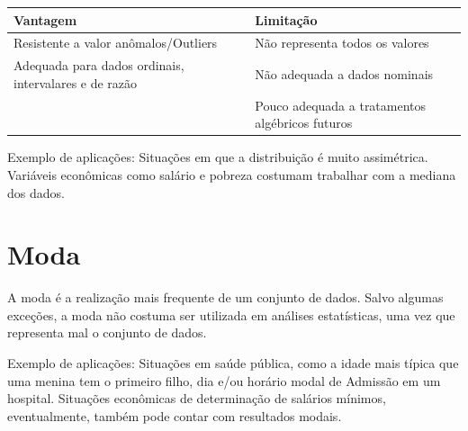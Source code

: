 \documentclass[
]{book}
\begin{document}
\begin{longtable}[]{@{}ll@{}}
\toprule
\begin{minipage}[b]{0.47\columnwidth}\raggedright
Vantagem\strut
\end{minipage} & \begin{minipage}[b]{0.47\columnwidth}\raggedright
Limitação\strut
\end{minipage}\tabularnewline
\midrule
\endhead
\begin{minipage}[t]{0.47\columnwidth}\raggedright
Resistente a valor anômalos/Outliers\strut
\end{minipage} & \begin{minipage}[t]{0.47\columnwidth}\raggedright
Não representa todos os valores\strut
\end{minipage}\tabularnewline
\begin{minipage}[t]{0.47\columnwidth}\raggedright
Adequada para dados ordinais, intervalares e de razão\strut
\end{minipage} & \begin{minipage}[t]{0.47\columnwidth}\raggedright
Não adequada a dados nominais\strut
\end{minipage}\tabularnewline
\begin{minipage}[t]{0.47\columnwidth}\raggedright
\strut
\end{minipage} & \begin{minipage}[t]{0.47\columnwidth}\raggedright
Pouco adequada a tratamentos algébricos futuros\strut
\end{minipage}\tabularnewline
\bottomrule
\end{longtable}

Exemplo de aplicações: Situações em que a distribuição é muito assimétrica. Variáveis econômicas como salário e pobreza costumam trabalhar com a mediana dos dados.

\hypertarget{moda}{%
\section{Moda}\label{moda}}

A moda é a realização mais frequente de um conjunto de dados. Salvo algumas exceções, a moda não costuma ser utilizada em análises estatísticas, uma vez que representa mal o conjunto de dados.

Exemplo de aplicações: Situações em saúde pública, como a idade mais típica que uma menina tem o primeiro filho, dia e/ou horário modal de Admissão em um hospital. Situações econômicas de determinação de salários mínimos, eventualmente, também pode contar com resultados modais.
\end{document}

